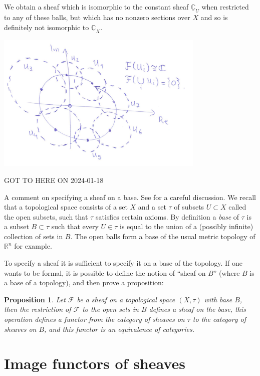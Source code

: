 \documentclass[12pt]{article}
\theoremstyle{plain}
\newtheorem{prop}[thm]{Proposition}
\theoremstyle{definition}
\numberwithin{equation}{section}
\newcommand{\C}{\mathbb{C}}
\newcommand{\R}{\mathbb{R}}
\newcommand{\CF}{\mathcal{F}}
\begin{document}
We obtain a sheaf which is isomorphic to the constant sheaf $\underline{\C}_U$ when restricted to any of these balls, but which has no nonzero sections over $X$ and so is definitely not isomorphic to $\underline{\C}_X$.
\begin{center}
\includegraphics[width=100mm]{nontriv-loc-sys.png}
\end{center}


{\color{red}GOT TO HERE ON 2024-01-18}

A comment on specifying a sheaf on a base. See {\cite[Section 6.30]{stacks-project}} for a careful discussion.
We recall that a topological space consists of a set $X$ and a set $\tau$ of subsets $U \subset X$ called the open subsets, such that $\tau$ satisfies certain axioms. By definition a \emph{base} of $\tau$ is a subset $B \subset \tau$ such that every $U \in \tau$ is equal to the union of a (possibly infinite) collection of sets in $B$. The open balls form a base of the usual metric topology of $\R^n$ for example.

To specify a sheaf it is sufficient to specify it on a base of the topology. If one wants to be formal, it is possible to define the notion of ``sheaf on $B$'' (where $B$ is a base of a topology), and then prove a proposition:
\begin{prop}
Let $\CF$ be a sheaf on a topological space $(X, \tau)$ with base $B$, then the restriction of $\CF$ to the open sets in $B$ defines a sheaf on the base, this operation defines a functor from the category of sheaves on $\tau$ to the category of sheaves on $B$, and this functor is an equivalence of categories.
\end{prop}



\section{Image functors of sheaves}
\end{document}

